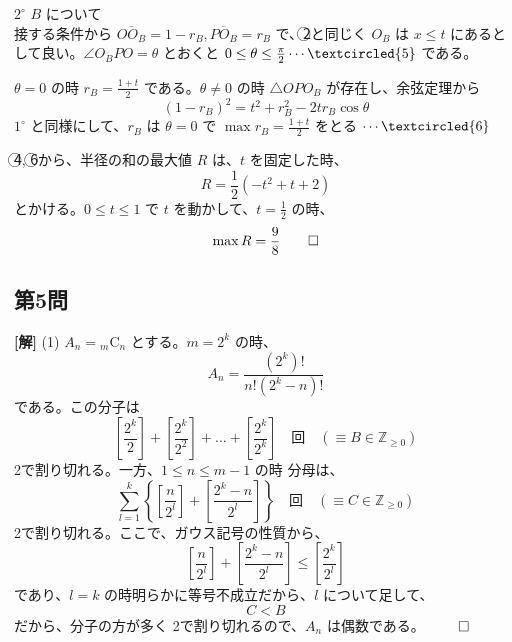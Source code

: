 \documentclass[../main.tex]{subfiles}
\begin{document}
\bigskip

\noindent
$2^\circ$ $B$ について \\
接する条件から $\overline{OO_B} = 1 - r_B, \overline{PO_B} = r_B$ で、\textcircled{2}と同じく $O_B$ は $x \le t$ にあるとして良い。$\angle O_B PO = \theta$ とおくと $0 \le \theta \le \frac{\pi}{2} \cdots \textcircled{5}$ である。

\begin{center}
\end{center}

\noindent
$\theta = 0$ の時 $r_B = \frac{1+t}{2}$ である。$\theta \neq 0$ の時 $\triangle OPO_B$ が存在し、余弦定理から
\[
  (1 - r_B)^2 = t^2 + r_B^2 - 2t r_B \cos\theta
\]
$1^\circ$ と同様にして、$r_B$ は $\theta = 0$ で $\max r_B = \frac{1+t}{2}$ をとる $\cdots \textcircled{6}$

\bigskip

\noindent
\textcircled{4}, \textcircled{6}から、半径の和の最大値 $R$ は、$t$ を固定した時、
\[
  R = \frac{1}{2}(-t^2 + t + 2)
\]
とかける。$0 \le t \le 1$ で $t$ を動かして、$t = \frac{1}{2}$ の時、
\[
  \max R = \frac{9}{8} \hfill \qed
\]

\newpage

\subsection*{第5問}

\noindent
\textbf{[解]} (1) $A_n = {}_m\mathrm{C}_n$ とする。$m = 2^k$ の時、
\[
  A_n = \frac{(2^k)!}{n! (2^k - n)!}
\]
である。この分子は
\[
  \left[ \frac{2^k}{2} \right] + \left[ \frac{2^k}{2^2} \right] + \dots + \left[ \frac{2^k}{2^k} \right] \quad \text{回} \quad (\equiv B \in \mathbb{Z}_{\ge 0})
\]
2で割り切れる。一方、$1 \le n \le m-1$ の時 分母は、
\[
  \sum_{l=1}^k \left\{ \left[ \frac{n}{2^l} \right] + \left[ \frac{2^k - n}{2^l} \right] \right\} \quad \text{回} \quad (\equiv C \in \mathbb{Z}_{\ge 0})
\]
2で割り切れる。ここで、ガウス記号の性質から、
\[
  \left[ \frac{n}{2^l} \right] + \left[ \frac{2^k - n}{2^l} \right] \le \left[ \frac{2^k}{2^l} \right]
\]
であり、$l = k$ の時明らかに等号不成立だから、$l$ について足して、
\[
  C < B
\]
だから、分子の方が多く 2で割り切れるので、$A_n$ は偶数である。 \hfill $\qed$
\end{document}
